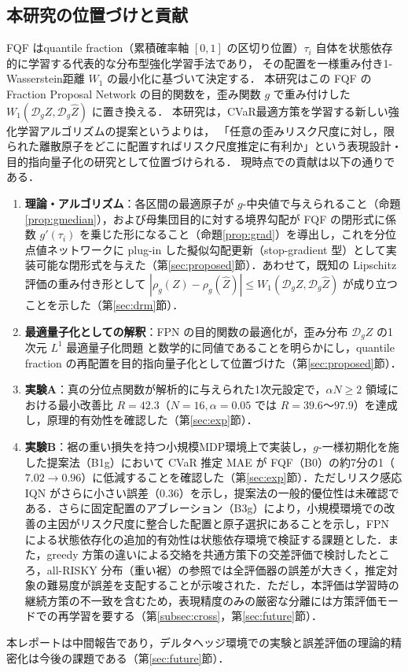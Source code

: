 \documentclass[a4paper,10pt]{jsarticle}
\theoremstyle{definition}
\newcommand{\Wone}{W_1}
\newcommand{\dist}{\mathcal{D}_g}
\begin{document}
\subsection{本研究の位置づけと貢献}
FQF \cite{yang2019fqf} はquantile fraction（累積確率軸 $[0, 1]$ の区切り位置）$\tau_i$ 自体を状態依存的に学習する代表的な分布型強化学習手法であり，
その配置を一様重み付き1-Wasserstein距離 $\Wone$ の最小化に基づいて決定する．
本研究はこの FQF の Fraction Proposal Network の目的関数を，歪み関数 $g$ で重み付けした $\Wone(\dist Z,\dist\hat{Z})$ に置き換える．
本研究は，CVaR最適方策を学習する新しい強化学習アルゴリズムの提案というよりは，
「任意の歪みリスク尺度に対し，限られた離散原子をどこに配置すればリスク尺度推定に有利か」という表現設計・目的指向量子化の研究として位置づけられる．
現時点での貢献は以下の通りである．
\begin{enumerate}
  \item \textbf{理論・アルゴリズム}：各区間の最適原子が $g$-中央値で与えられること（命題\ref{prop:gmedian}），および母集団目的に対する境界勾配が FQF の閉形式に係数 $g'(\tau_i)$ を乗じた形になること（命題\ref{prop:grad}）を導出し，これを分位点値ネットワークに plug-in した擬似勾配更新（stop-gradient 型）として実装可能な閉形式を与えた（第\ref{sec:proposed}節）．あわせて，既知の Lipschitz 評価の重み付き形として $|\rho_g(Z)-\rho_g(\hat Z)|\le \Wone(\dist Z,\dist \hat Z)$ が成り立つことを示した（第\ref{sec:drm}節）．
  \item \textbf{最適量子化としての解釈}：FPN の目的関数の最適化が，歪み分布 $\dist Z$ の1次元 $L^1$ 最適量子化問題 \cite{graf2000quantization} と数学的に同値であることを明らかにし，quantile fraction の再配置を目的指向量子化として位置づけた（第\ref{sec:proposed}節）．
  \item \textbf{実験A}：真の分位点関数が解析的に与えられた1次元設定で，$\alpha N\ge2$ 領域における最小改善比 $R=42.3$（$N=16, \alpha=0.05$ では $R=39.6$〜$97.9$）を達成し，原理的有効性を確認した（第\ref{sec:exp}節）．
  \item \textbf{実験B}：裾の重い損失を持つ小規模MDP環境上で実装し，$g$-一様初期化を施した提案法（B1g）において CVaR 推定 MAE が FQF（B0）の約7分の1（$7.02\to0.96$）に低減することを確認した（第\ref{sec:exp}節）．ただしリスク感応 IQN がさらに小さい誤差（$0.36$）を示し，提案法の一般的優位性は未確認である．さらに固定配置のアブレーション（B3g）により，小規模環境での改善の主因がリスク尺度に整合した配置と原子選択にあることを示し，FPN による状態依存化の追加的有効性は状態依存環境で検証する課題とした．また，greedy 方策の違いによる交絡を共通方策下の交差評価で検討したところ，all-RISKY 分布（重い裾）の参照では全評価器の誤差が大きく，推定対象の難易度が誤差を支配することが示唆された．ただし，本評価は学習時の継続方策の不一致を含むため，表現精度のみの厳密な分離には方策評価モードでの再学習を要する（第\ref{subsec:cross}，第\ref{sec:future}節）．
\end{enumerate}
本レポートは中間報告であり，デルタヘッジ環境での実験と誤差評価の理論的精密化は今後の課題である（第\ref{sec:future}節）．
\end{document}
